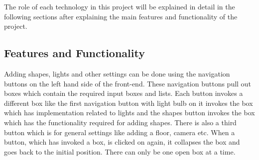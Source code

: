 \documentclass[10pt]{scrartcl}
\begin{document}
The role of each technology in this project will be explained in detail in the following sections after explaining the main features and functionality of the project.

\subsection{Features and Functionality}
Adding shapes, lights and other settings can be done using the navigation buttons on the left hand side of the front-end. These navigation buttons pull out boxes which contain the required input boxes and lists. Each button invokes a different box like the first navigation button with light bulb on it invokes the box which has implementation related to lights and the shapes button invokes the box which has the functionality required for adding shapes. There is also a third button which is for general settings like adding a floor, camera etc. When a button, which has invoked a box, is clicked on again, it collapses the box and goes back to the initial position. There can only be one open box at a time.
\end{document}
